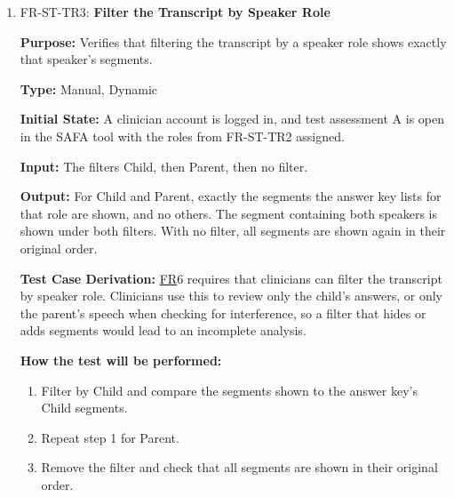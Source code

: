 \documentclass[12pt, titlepage]{article}
\newcommand{\srsfr}[1]{\href{https://github.com/Nour-Fawaz/MacaBoca/blob/main/pdfs/SRS/SRS.pdf}{FR}}
\renewcommand{\_}{\oldunderscore\allowbreak}
\begin{document}
\begin{enumerate}
  \item FR-ST-TR3: \textbf{Filter the Transcript by Speaker Role\\}
  \begin{mdframed}[linewidth=0.5mm]
      \textbf{Purpose:} Verifies that filtering the transcript by a speaker role shows exactly that speaker's segments. \par
      \textbf{Type:} Manual, Dynamic \par
      \textbf{Initial State:} A clinician account is logged in, and test assessment A is open in the SAFA tool with the roles from FR-ST-TR2 assigned. \par
      \textbf{Input:} The filters Child, then Parent, then no filter. \par
      \textbf{Output:} For Child and Parent, exactly the segments the answer key lists for that role are shown, and no others. The segment containing both speakers is shown under both filters. With no filter, all segments are shown again in their original order. \par
      \textbf{Test Case Derivation:} \srsfr*{6} requires that clinicians can filter the transcript by speaker role. Clinicians use this to review only the child's answers, or only the parent's speech when checking for interference, so a filter that hides or adds segments would lead to an incomplete analysis. \par
      \textbf{How the test will be performed:}
      \begin{enumerate}
        \item[1.] Filter by Child and compare the segments shown to the answer key's Child segments.
        \item[2.] Repeat step 1 for Parent.
        \item[3.] Remove the filter and check that all segments are shown in their original order.
      \end{enumerate}
  \end{mdframed}


\end{enumerate}
\end{document}
